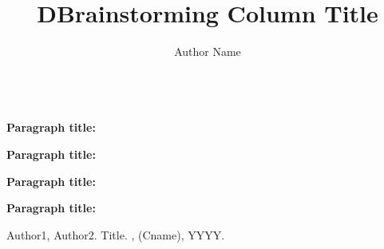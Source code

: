 \documentclass{sig-alternate-10pt}
\title{DBrainstorming Column Title}
\author{
\alignauthor
Author Name\\
       \affaddr{Affiliation}\\
       \email{name@email.edu}
}
\begin{document}
\maketitle{}

\noindent\textbf{Paragraph title:} 
\lipsum[2]

\noindent\textbf{Paragraph title:} 
\lipsum[3-4]

\noindent\textbf{Paragraph title:} 
\lipsum[5]

\noindent\textbf{Paragraph title:} 
\cite{item} \lipsum[2-4]



\balance

\begin{thebibliography}{10}

Author1, Author2.
\newblock Title.
, (Cname), YYYY.


\end{thebibliography}
\end{document}
